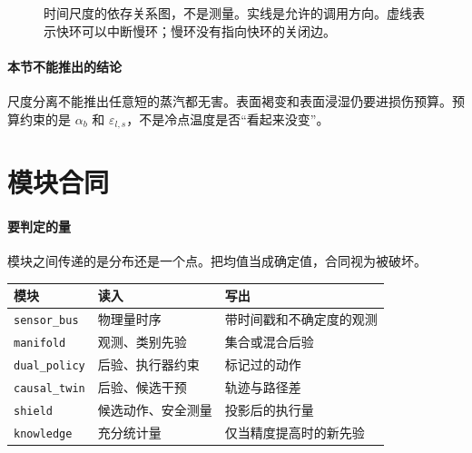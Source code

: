 \begin{figure}[ht]
\centering
{}
\caption{时间尺度的依存关系图，不是测量。实线是允许的调用方向。虚线表示快环可以中断慢环；慢环没有指向快环的关闭边。}
\end{figure}

\paragraph{本节不能推出的结论}
尺度分离不能推出任意短的蒸汽都无害。表面褐变和表面浸湿仍要进损伤预算。预算约束的是 \(\alpha_b\) 和 \(\varepsilon_{l,s}\)，不是冷点温度是否“看起来没变”。

\section{模块合同}

\paragraph{要判定的量}
模块之间传递的是分布还是一个点。把均值当成确定值，合同视为被破坏。

\begin{center}
\begin{tabularx}{\textwidth}{llX}
\toprule
模块 & 读入 & 写出 \\
\midrule
\texttt{sensor\_bus} & 物理量时序 & 带时间戳和不确定度的观测 \\
\texttt{manifold} & 观测、类别先验 & 集合或混合后验 \\
\texttt{dual\_policy} & 后验、执行器约束 & 标记过的动作 \\
\texttt{causal\_twin} & 后验、候选干预 & 轨迹与路径差 \\
\texttt{shield} & 候选动作、安全测量 & 投影后的执行量 \\
\texttt{knowledge} & 充分统计量 & 仅当精度提高时的新先验 \\
\bottomrule
\end{tabularx}
\end{center}


